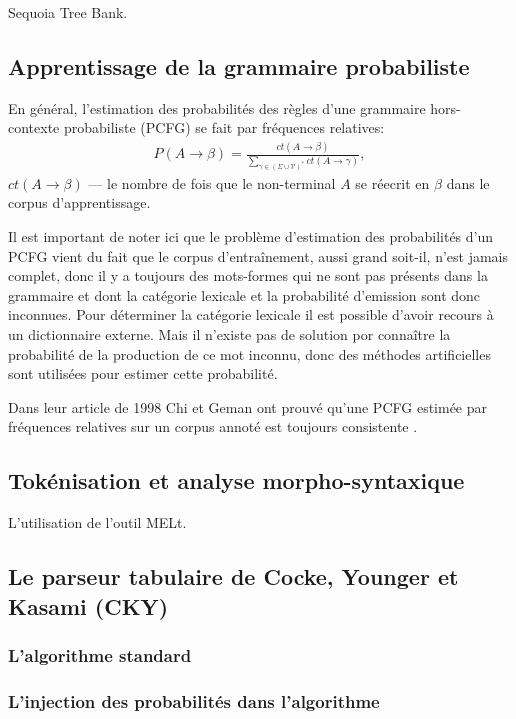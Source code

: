 \documentclass[12pt]{article}
\begin{document}
Sequoia Tree Bank. \cite{Sequoia}

\subsection{Apprentissage de la grammaire probabiliste}

En g\'en\'eral, l'estimation des probabilit\'es des r\`egles d'une grammaire
hors-contexte probabiliste (PCFG) se fait par fr\'equences relatives:
\begin{eqnarray}
P(A \rightarrow \beta) = \frac{ct(A \rightarrow \beta)}{\sum\limits_{\gamma \in (\Sigma \cup \mathcal{V})^*}{ct(A \rightarrow \gamma)}},
\end{eqnarray}
$ct(A \rightarrow \beta)$ --- le nombre de fois que le non-terminal $A$ se r\'eecrit en $\beta$ dans le corpus d'apprentissage.

Il est important de noter ici que le probl\`eme d'estimation des probabilit\'es
d'un PCFG vient du fait que le corpus d'entra\^inement, aussi grand soit-il,
n'est jamais complet, donc il y a toujours des mots-formes qui ne sont pas
pr\'esents dans la grammaire et dont la cat\'egorie lexicale et la
probabilit\'e d'emission sont donc inconnues. Pour d\'eterminer la cat\'egorie
lexicale il est possible d'avoir recours \`a un dictionnaire externe. Mais il
n'existe pas de solution por conna\^itre la probabilit\'e de la production de ce
mot inconnu, donc des m\'ethodes artificielles sont utilis\'ees pour estimer
cette probabilit\'e.

Dans leur article de 1998 Chi et Geman ont prouv\'e qu'une PCFG estim\'ee par
fr\'equences relatives sur un corpus annot\'e est toujours consistente \cite{proper_PCFG_estimation}.

\subsection{Tok\'enisation et analyse morpho-syntaxique}

L'utilisation de l'outil MELt.

\subsection{Le parseur tabulaire de Cocke, Younger et Kasami (CKY)}

\subsubsection{L'algorithme standard}
\subsubsection{L'injection des probabilit\'es dans l'algorithme}
\end{document}
